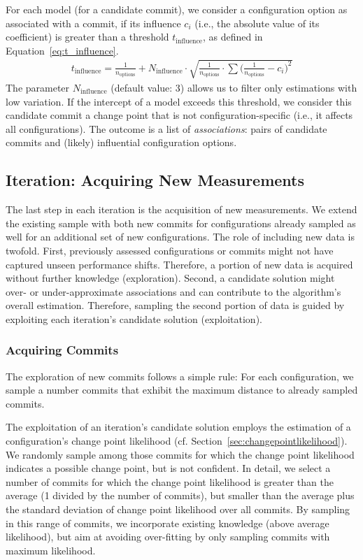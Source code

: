 \documentclass[sigconf]{acmart}
\begin{document}
	For each model (for a candidate commit), we consider a configuration option as associated with a commit, if its influence $c_i$ (i.e., the absolute value of its coefficient) is greater than a threshold $t_\text{influence}$, as defined in Equation~\ref{eq:t_influence}.
	\begin{equation}
	\begin{gathered}
		t_\text{influence} = \frac{1}{n_\text{options}} + N_\text{influence} \cdot \sqrt{\frac{1}{n_\text{options}} \cdot \sum \Big(\frac{1}{n_\text{options}} - c_i\Big)^2}
		\label{eq:t_influence}
	\end{gathered}
	\end{equation}
	The parameter $N_\text{influence}$ (default value: 3) allows us to filter only estimations with low variation. If the intercept of a model exceeds this threshold, we consider this candidate commit a change point that is not configuration-specific (i.e., it affects all configurations). The outcome is a list of \emph{associations}: pairs of candidate commits and (likely) influential configuration options. 
	
	\subsection{Iteration: Acquiring New Measurements}\label{sec:acquisition}
 	The last step in each iteration is the acquisition of new measurements. We extend the existing sample with both new commits for configurations already sampled as well for an additional set of new configurations. The role of including new data is twofold. First, previously assessed configurations or commits might not have captured unseen performance shifts. Therefore, a portion of new data is acquired without further knowledge (exploration). Second, a candidate solution might over- or under-approximate associations and can contribute to the algorithm's overall estimation. Therefore, sampling the second portion of data is guided by exploiting each iteration's candidate solution (exploitation).
 	
 	\subsubsection{Acquiring Commits}
 	The exploration of new commits follows a simple rule: For each configuration, we sample a number commits that exhibit the maximum distance to already sampled commits. 
 	
 	The exploitation of an iteration's candidate solution employs the estimation of a configuration's change point likelihood (cf. Section~\ref{sec:changepointlikelihood}). We randomly sample among those commits for which the change point likelihood indicates a possible change point, but is not confident. In detail, we select a number of commits for which the change point likelihood is greater than the average (1 divided by the number of commits), but smaller than the average plus the standard deviation of change point likelihood over all commits. By sampling in this range of commits, we incorporate existing knowledge (above average likelihood), but aim at avoiding over-fitting by only sampling commits with maximum likelihood.
 	 
\end{document}
